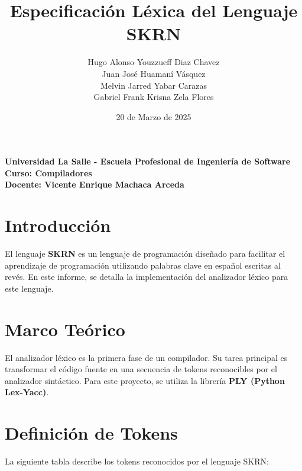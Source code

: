 \documentclass[a4paper,12pt]{article}
\title{\textbf{Especificación Léxica del Lenguaje SKRN}}
\author{
    Hugo Alonso Youzzueff Diaz Chavez\\
    Juan José Huamaní Vásquez\\
    Melvin Jarred Yabar Carazas\\
    Gabriel Frank Krisna Zela Flores
}
\date{20 de Marzo de 2025}
\begin{document}
\maketitle
\begin{center}
    \textbf{Universidad La Salle - Escuela Profesional de Ingeniería de Software}\\
    \textbf{Curso: Compiladores}\\
    \textbf{Docente: Vicente Enrique Machaca Arceda}
\end{center}

\newpage

\section{Introducción}
El lenguaje \textbf{SKRN} es un lenguaje de programación diseñado para facilitar el aprendizaje de programación utilizando palabras clave en español escritas al revés. En este informe, se detalla la implementación del analizador léxico para este lenguaje.

\section{Marco Teórico}
El analizador léxico es la primera fase de un compilador. Su tarea principal es transformar el código fuente en una secuencia de tokens reconocibles por el analizador sintáctico. Para este proyecto, se utiliza la librería \textbf{PLY (Python Lex-Yacc)}.

\section{Definición de Tokens}
La siguiente tabla describe los tokens reconocidos por el lenguaje SKRN:
\end{document}

